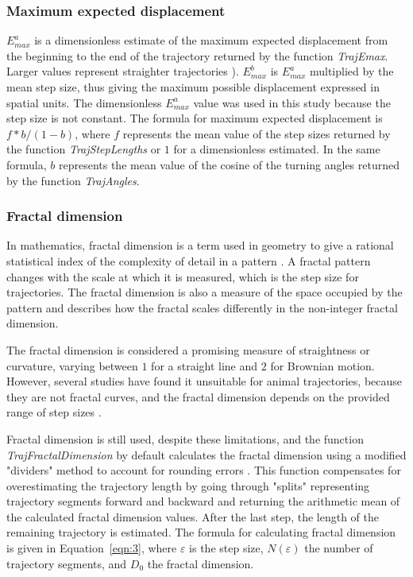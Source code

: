 \let\LaTeXcline\cline\documentclass[sn-mathphys-num]{sn-jnl}\let\cline\LaTeXcline
\begin{document}
\subsubsection{Maximum expected displacement}

$E_{max}^{a}$ is a dimensionless estimate of the maximum expected displacement from the beginning to the end of the trajectory returned by the function \textit{TrajEmax}. Larger values represent straighter trajectories \cite{Cheung2007}). $E_{max}^{b}$ is $E_{max}^{a}$ multiplied by the mean step size, thus giving the maximum possible displacement expressed in spatial units. The dimensionless $E_{max}^{a}$ value was used in this study because the step size is not constant. The formula for maximum expected displacement is $f * b / (1 - b)$, where $f$ represents the mean value of the step sizes returned by the function \textit{TrajStepLengths} or $1$ for a dimensionless estimated. In the same formula, $b$ represents the mean value of the cosine of the turning angles returned by the function \textit{TrajAngles}.
 
\subsubsection{Fractal dimension}

In mathematics, fractal dimension is a term used in geometry to give a rational statistical index of the complexity of detail in a pattern \cite{Mandelbrot1967}. A fractal pattern changes with the scale at which it is measured, which is the step size for trajectories. The fractal dimension is also a measure of the space occupied by the pattern and describes how the fractal scales differently in the non-integer fractal dimension.

The fractal dimension is considered a promising measure of straightness or curvature, varying between $1$ for a straight line and $2$ for Brownian motion. However, several studies have found it unsuitable for animal trajectories, because they are not fractal curves, and the fractal dimension depends on the provided range of step sizes \cite{Nams2006, Turchin1996}.

Fractal dimension is still used, despite these limitations, and the function \textit{TrajFractalDimension} by default calculates the fractal dimension using a modified  "dividers" method to account for rounding errors \cite{Nams2006}. This function compensates for overestimating the trajectory length by going through "splits" representing trajectory segments forward and backward and returning the arithmetic mean of the calculated fractal dimension values. After the last step, the length of the remaining trajectory is estimated. The formula for calculating fractal dimension is given in Equation~\ref{eqn:3}, where $\varepsilon$ is the step size, $N(\varepsilon)$ the number of trajectory segments, and $D_{0}$ the fractal dimension.
  
\end{document}
